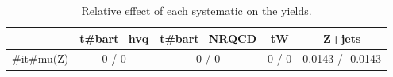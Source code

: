 \documentclass[10pt]{article}
\begin{document}
\begin{table}[htbp]
\begin{center}
\begin{tabular}{|c|c|c|c|c|}
\hline 
      & t#bar{t}_{hvq}      & t#bar{t}_{NRQCD}      & tW      & Z+jets \\ 
\hline 
  #it{#mu}(Z) & 0 / 0 & 0 / 0 & 0 / 0 & 0.0143 / -0.0143 \\ 
\hline 
\end{tabular} 
\caption{Relative effect of each systematic on the yields.} 
\end{center} 
\end{table} 
\end{document}
